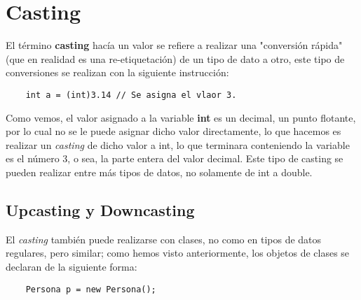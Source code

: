 \section{Casting}

El término \textbf{casting} hacía un valor se refiere a realizar una "conversión rápida" (que en realidad es una re-etiquetación) de un tipo de dato a otro, este tipo de conversiones se realizan con la siguiente instrucción:
\begin{lstlisting}
    int a = (int)3.14 // Se asigna el vlaor 3.
\end{lstlisting}

Como vemos, el valor asignado a la variable \textbf{int} es un decimal, un punto flotante, por lo cual no se le puede asignar dicho valor directamente, lo que hacemos es realizar un \textit{casting} de dicho valor a int, lo que terminara conteniendo la variable es el número 3, o sea, la parte entera del valor decimal. Este tipo de casting se pueden realizar entre más tipos de datos, no solamente de int a double.


\subsection{Upcasting y Downcasting}

El \textit{casting} también puede realizarse con clases, no como en tipos de datos regulares, pero similar; como hemos visto anteriormente, los objetos de clases se declaran de la siguiente forma:
\begin{lstlisting}
    Persona p = new Persona();
\end{lstlisting}


